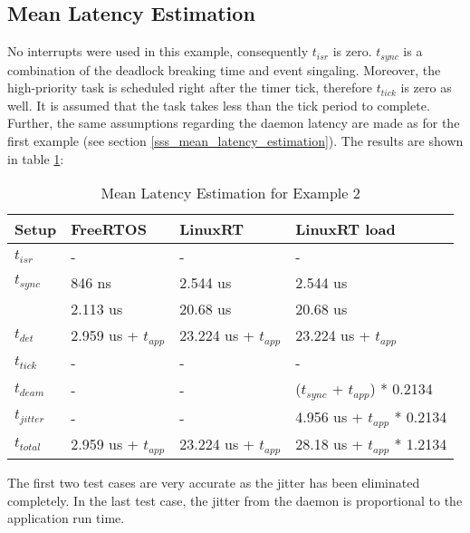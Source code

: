\subsection{Mean Latency Estimation}\label{sss_mean_latency_estimation2}
No interrupts were used in this example, consequently $t_{isr}$ is zero.
$t_{sync}$ is a combination of the deadlock breaking time and event singaling. 
Moreover, the high-priority task is scheduled right after the timer tick, therefore $t_{tick}$ is zero as well.
It is assumed that the task takes less than the tick period to complete. 
Further, the same assumptions regarding the daemon latency are made as for the first example (see section \ref{sss_mean_latency_estimation}).
The results are shown in table \ref{tab_example2_mean}:
\begin{table}[htbp]
	\centering
		\begin{tabular}{|l|l|l|l|}
			\hline
				Setup					& FreeRTOS 								& LinuxRT 							& LinuxRT load  \\
				\hline 
			 	$t_{isr}$ 		& -				 								& -											& -							\\
			  $t_{sync}$		& 846 ns			  	  			& 2.544 us 				 			& 2.544 us			\\
			  							&	2.113 us								& 20.68 us							& 20.68 us			\\
			  \hline 
			  $t_{det}$			& 2.959 us + $t_{app}$		& 23.224 us + $t_{app}$	& 23.224 us	+ $t_{app}$		\\ 
			  \hline
			  \hline
			  $t_{tick}$		& -												& -					 					  & -													\\
			  $t_{deam}$		& -				  							& - 				 						& ($t_{sync}$ + $t_{app}$) * 0.2134 \\ 
				\hline 
			  $t_{jitter}$	& -				  							& -										  & 4.956 us	+ $t_{app}$ * 0.2134 \\ 
			  \hline
			  \hline 
			  $t_{total}$		& 2.959 us + $t_{app}$	 & 23.224 us + $t_{app}$  &	28.18 us + $t_{app}$ * 1.2134 	\\ 
			\hline
		\end{tabular}
	\caption{Mean Latency Estimation for Example 2}
	\label{tab_example2_mean}
\end{table}
The first two test cases are very accurate as the jitter has been eliminated completely.
In the last test case, the jitter from the daemon is proportional to the application run time.


